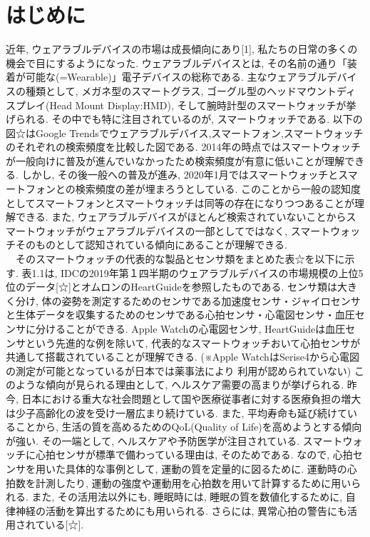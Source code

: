 \documentclass[report, 11pt, a4paper]{jsbook}
\begin{document}
\section{はじめに}
近年, ウェアラブルデバイスの市場は成長傾向にあり[1], 私たちの日常の多くの機会で目にするようになった. ウェアラブルデバイスとは,  その名前の通り「装着が可能な(=Wearable)」電子デバイスの総称である. 主なウェアラブルデバイスの種類として, メガネ型のスマートグラス, ゴーグル型のヘッドマウントディスプレイ(Head Mount Display:HMD), そして腕時計型のスマートウォッチが挙げられる. その中でも特に注目されているのが, スマートウォッチである. 以下の図☆はGoogle Trendsでウェアラブルデバイス,スマートフォン,スマートウォッチのそれぞれの検索頻度を比較した図である. 2014年の時点ではスマートウォッチが一般向けに普及が進んでいなかったため検索頻度が有意に低いことが理解できる. しかし, その後一般への普及が進み, 2020年1月ではスマートウォッチとスマートフォンとの検索頻度の差が埋まろうとしている. このことから一般の認知度としてスマートフォンとスマートウォッチは同等の存在になりつつあることが理解できる. また, ウェアラブルデバイスがほとんど検索されていないことからスマートウォッチがウェアラブルデバイスの一部としてではなく, スマートウォッチそのものとして認知されている傾向にあることが理解できる.\\
　そのスマートウォッチの代表的な製品とセンサ類をまとめた表☆を以下に示す. 表1.1は, IDCの2019年第１四半期のウェアラブルデバイスの市場規模の上位5位のデータ[☆]とオムロンのHeartGuideを参照したものである. センサ類は大きく分け, 体の姿勢を測定するためのセンサである加速度センサ・ジャイロセンサと生体データを収集するためのセンサである心拍センサ・心電図センサ・血圧センサに分けることができる. Apple Watchの心電図センサ, HeartGuideは血圧センサという先進的な例を除いて, 代表的なスマートウォッチおいて心拍センサが共通して搭載されていることが理解できる. (※Apple WatchはSerise4から心電図の測定が可能となっているが日本では薬事法により
利用が認められていない) このような傾向が見られる理由として, ヘルスケア需要の高まりが挙げられる. 昨今, 日本における重大な社会問題として国や医療従事者に対する医療負担の増大は少子高齢化の波を受け一層広まり続けている. また, 平均寿命も延び続けていることから, 生活の質を高めるためのQoL(Quality of Life)を高めようとする傾向が強い. その一端として, ヘルスケアや予防医学が注目されている. スマートウォッチに心拍センサが標準で備わっている理由は, そのためである. なので, 心拍センサを用いた具体的な事例として, 運動の質を定量的に図るために. 運動時の心拍数を計測したり, 運動の強度や運動用を心拍数を用いて計算するために用いられる. また, その活用法以外にも, 睡眠時には, 睡眠の質を数値化するために, 自律神経の活動を算出するためにも用いられる. さらには, 異常心拍の警告にも活用されている[☆].  \\
\end{document}
